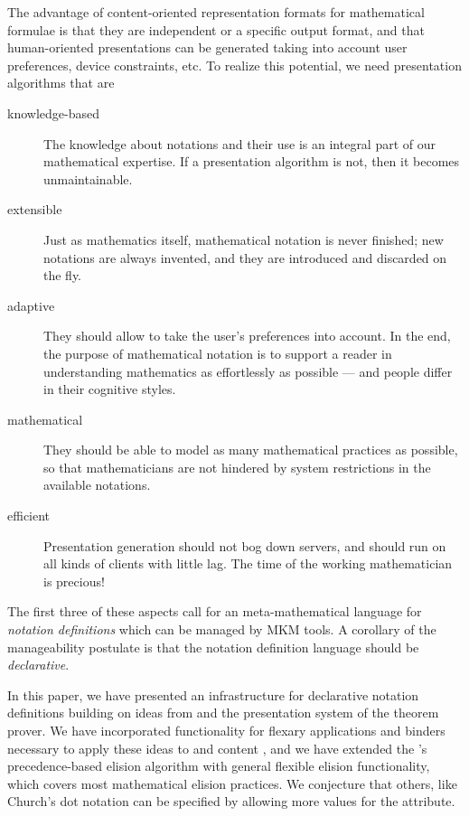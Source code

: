 \documentclass[a4paper]{article}
\begin{document}
The advantage of content-oriented representation formats for mathematical formulae is that
they are independent or a specific output format, and that human-oriented presentations
can be generated taking into account user preferences, device constraints, etc. To realize
this potential, we need presentation algorithms that are
\begin{description}
\item[knowledge-based] The knowledge about notations and their use is an integral part of
  our mathematical expertise. If a presentation algorithm is not, then it becomes
  unmaintainable.
\item[extensible] Just as mathematics itself, mathematical notation is never finished; new
  notations are always invented, and they are introduced and discarded on the fly.
\item[adaptive] They should allow to take the user's preferences into account. In the end,
  the purpose of mathematical notation is to support a reader in understanding mathematics
  as effortlessly as possible --- and people differ in their cognitive styles.
\item[mathematical] They should be able to model as many mathematical practices as
  possible, so that mathematicians are not hindered by system restrictions in the
  available notations.
\item[efficient] Presentation generation should not bog down servers, and should run on
  all kinds of clients with little lag. The time of the working mathematician is precious!
\end{description}
The first three of these aspects call for an meta-mathematical language for
{\emph{notation definitions}} which can be managed by MKM tools. A corollary of the
manageability postulate is that the notation definition language should be
{\emph{declarative}}. 

In this paper, we have presented an infrastructure for declarative notation definitions
building on ideas from {} and the presentation system of the {\isabelle}
theorem prover. We have incorporated functionality for flexary applications and binders
necessary to apply these ideas to {\openmath} and content {\mathml}, and we have extended
the {\isabelle}'s precedence-based elision algorithm with general flexible elision
functionality, which covers most mathematical elision practices. We conjecture that
others, like Church's dot notation can be specified by allowing more values for the
{} attribute.
\end{document}
